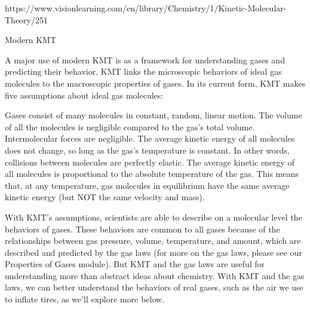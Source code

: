 https://www.visionlearning.com/en/library/Chemistry/1/Kinetic-Molecular-Theory/251

Modern KMT

A major use of modern KMT is as a framework for understanding gases and predicting their behavior. KMT links the microscopic behaviors of ideal gas molecules to the macroscopic properties of gases. In its current form, KMT makes five assumptions about ideal gas molecules:

        Gases consist of many molecules in constant, random, linear motion.
        The volume of all the molecules is negligible compared to the gas’s total volume.
        Intermolecular forces are negligible.
        The average kinetic energy of all molecules does not change, so long as the gas’s temperature is constant. In other words, collisions between molecules are perfectly elastic.
        The average kinetic energy of all molecules is proportional to the absolute temperature of the gas. This means that, at any temperature, gas molecules in equilibrium have the same average kinetic energy (but NOT the same velocity and mass).

With KMT’s assumptions, scientists are able to describe on a molecular level the behaviors of gases. These behaviors are common to all gases because of the relationships between gas pressure, volume, temperature, and amount, which are described and predicted by the gas laws (for more on the gas laws, please see our Properties of Gases module). But KMT and the gas laws are useful for understanding more than abstract ideas about chemistry. With KMT and the gas laws, we can better understand the behaviors of real gases, such as the air we use to inflate tires, as we’ll explore more below.
